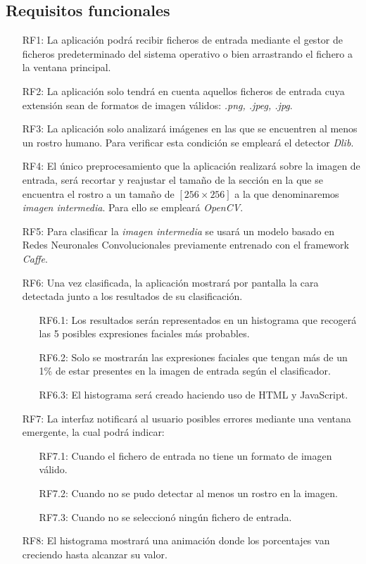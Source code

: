 \documentclass[a4paper,11pt]{book}
\begin{document}
\subsection{Requisitos funcionales}
\begin{itemize}
	\item [RF1:] La aplicación podrá recibir ficheros de entrada mediante el gestor de ficheros predeterminado del sistema operativo o bien arrastrando el fichero a la ventana principal.
	\item [RF2:] La aplicación solo tendrá en cuenta aquellos ficheros de entrada cuya extensión sean de formatos de imagen válidos: \textit{.png, .jpeg, .jpg}.
	\item [RF3:] La aplicación solo analizará imágenes en las que se encuentren al menos un rostro humano. Para verificar esta condición se empleará el detector \textit{Dlib}.
	\item [RF4:] El único preprocesamiento que la aplicación realizará sobre la imagen de entrada, será recortar y reajustar el tamaño de la sección en la que se encuentra el rostro a un tamaño de \([256 \times 256]\) a la que denominaremos \textit{imagen intermedia}. Para ello se empleará \textit{OpenCV}.
	\item [RF5:] Para clasificar la \textit{imagen intermedia} se usará un modelo basado en Redes Neuronales Convolucionales previamente entrenado con el framework \textit{Caffe}.
	\item [RF6:] Una vez clasificada, la aplicación mostrará por pantalla la cara detectada junto a los resultados de su clasificación.
	\begin{enumerate}
		\item [RF6.1:] Los resultados serán representados en un histograma que recogerá las 5 posibles expresiones faciales más probables.
		\item [RF6.2:] Solo se mostrarán las expresiones faciales que tengan más de un 1\% de estar presentes en la imagen de entrada según el clasificador.
		\item [RF6.3:] El histograma será creado haciendo uso de HTML y JavaScript.
	\end{enumerate}
	\item [RF7:] La interfaz notificará al usuario posibles errores mediante una ventana emergente, la cual podrá indicar:
	\begin{enumerate}
		\item [RF7.1:] Cuando el fichero de entrada no tiene un formato de imagen válido.
		\item [RF7.2:] Cuando no se pudo detectar al menos un rostro en la imagen.
		\item [RF7.3:] Cuando no se seleccionó ningún fichero de entrada.
	\end{enumerate}
	\item [RF8:] El histograma mostrará una animación donde los porcentajes van creciendo hasta alcanzar su valor.
\end{itemize}
\end{document}
